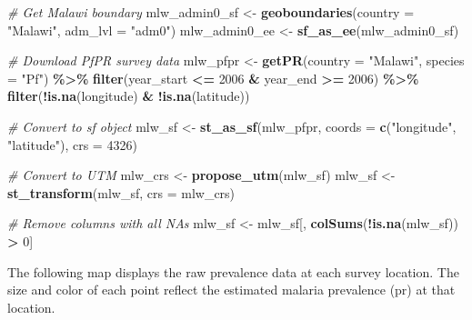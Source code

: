 \documentclass[
  letterpaper,
]{krantz}
\newenvironment{Shaded}{\begin{snugshade}}{\end{snugshade}}
\newcommand{\AttributeTok}[1]{\textcolor[rgb]{0.13,0.29,0.53}{#1}}
\newcommand{\CommentTok}[1]{\textcolor[rgb]{0.56,0.35,0.01}{\textit{#1}}}
\newcommand{\DecValTok}[1]{\textcolor[rgb]{0.00,0.00,0.81}{#1}}
\newcommand{\FunctionTok}[1]{\textcolor[rgb]{0.13,0.29,0.53}{\textbf{#1}}}
\newcommand{\NormalTok}[1]{#1}
\newcommand{\OtherTok}[1]{\textcolor[rgb]{0.56,0.35,0.01}{#1}}
\newcommand{\SpecialCharTok}[1]{\textcolor[rgb]{0.81,0.36,0.00}{\textbf{#1}}}
\newcommand{\StringTok}[1]{\textcolor[rgb]{0.31,0.60,0.02}{#1}}
\begin{document}
\begin{Shaded}
\begin{Highlighting}[]
\CommentTok{\# Get Malawi boundary}
\NormalTok{mlw\_admin0\_sf }\OtherTok{\textless{}{-}} \FunctionTok{geoboundaries}\NormalTok{(}\AttributeTok{country =} \StringTok{"Malawi"}\NormalTok{, }\AttributeTok{adm\_lvl =} \StringTok{"adm0"}\NormalTok{)}
\NormalTok{mlw\_admin0\_ee }\OtherTok{\textless{}{-}} \FunctionTok{sf\_as\_ee}\NormalTok{(mlw\_admin0\_sf)}

\CommentTok{\# Download PfPR survey data}
\NormalTok{mlw\_pfpr }\OtherTok{\textless{}{-}} \FunctionTok{getPR}\NormalTok{(}\AttributeTok{country =} \StringTok{"Malawi"}\NormalTok{, }\AttributeTok{species =} \StringTok{"Pf"}\NormalTok{) }\SpecialCharTok{\%\textgreater{}\%}
  \FunctionTok{filter}\NormalTok{(year\_start }\SpecialCharTok{\textless{}=} \DecValTok{2006} \SpecialCharTok{\&}\NormalTok{ year\_end }\SpecialCharTok{\textgreater{}=} \DecValTok{2006}\NormalTok{) }\SpecialCharTok{\%\textgreater{}\%}
  \FunctionTok{filter}\NormalTok{(}\SpecialCharTok{!}\FunctionTok{is.na}\NormalTok{(longitude) }\SpecialCharTok{\&} \SpecialCharTok{!}\FunctionTok{is.na}\NormalTok{(latitude))}

\CommentTok{\# Convert to sf object}
\NormalTok{mlw\_sf }\OtherTok{\textless{}{-}} \FunctionTok{st\_as\_sf}\NormalTok{(mlw\_pfpr, }\AttributeTok{coords =} \FunctionTok{c}\NormalTok{(}\StringTok{"longitude"}\NormalTok{, }\StringTok{"latitude"}\NormalTok{), }\AttributeTok{crs =} \DecValTok{4326}\NormalTok{)}

\CommentTok{\# Convert to UTM }
\NormalTok{mlw\_crs }\OtherTok{\textless{}{-}} \FunctionTok{propose\_utm}\NormalTok{(mlw\_sf)}
\NormalTok{mlw\_sf }\OtherTok{\textless{}{-}} \FunctionTok{st\_transform}\NormalTok{(mlw\_sf, }\AttributeTok{crs =}\NormalTok{ mlw\_crs)}

\CommentTok{\# Remove columns with all NAs}
\NormalTok{mlw\_sf }\OtherTok{\textless{}{-}}\NormalTok{ mlw\_sf[, }\FunctionTok{colSums}\NormalTok{(}\SpecialCharTok{!}\FunctionTok{is.na}\NormalTok{(mlw\_sf)) }\SpecialCharTok{\textgreater{}} \DecValTok{0}\NormalTok{]}
\end{Highlighting}
\end{Shaded}

The following map displays the raw prevalence data at each survey
location. The size and color of each point reflect the estimated malaria
prevalence (pr) at that location.
\end{document}
